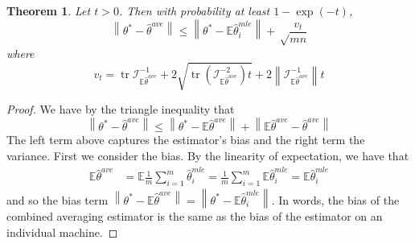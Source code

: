 \documentclass[twoside]{article}
\newtheorem{theorem}{Theorem}
\DeclareMathOperator*{\tr}{tr}
\newcommand{\E}{\mathbb{E}}
\newcommand{\w}{\theta}
\newcommand{\wave}{\hat\w^{ave}}
\newcommand{\wtave}{\E\hat\w^{ave}}
\newcommand{\wmle}{\hat\w^{mle}}
\newcommand{\wstar}{{\w^{*}}}
\newcommand{\I}{\mathcal I}
\newcommand{\ltwo}[1]{{\left\lVert {#1} \right\rVert}}
\begin{document}
\begin{theorem}
Let $t>0$.
Then with probability at least $1-\exp(-t)$,
\begin{equation}
\ltwo{\wstar-\wave} \le \ltwo{\wstar-\E\wmle_i} + \sqrt\frac{v_t}{mn}
\end{equation}
where
\begin{equation}
v_t =
\tr{\I^{-1}_{\wtave}}
+ 2\sqrt{\tr \left({\I^{-2}_{\wtave}}\right)t}
+ 2\ltwo{\I^{-1}_{\wtave}}t
\end{equation}
\end{theorem}
\begin{proof}
We have by the triangle inequality that
\begin{equation}
\ltwo{\wstar-\wave} \le \ltwo{\wstar-\E\wave} + \ltwo{\E\wave-\wave}
\label{eq:biasvar}
\end{equation}
The left term above captures the estimator's bias and the right term the variance.
First we consider the bias.
By the linearity of expectation, we have that
\begin{align}
\E\wave
&=
\E\frac{1}{m}\sum_{i=1}^m\wmle_i
=
\frac{1}{m}\sum_{i=1}^m\E\wmle_i
=
\E\wmle_i
\label{eq:expwave}
\end{align}
and so the bias term
$\ltwo{\wstar-\E\wave}
=
\ltwo{\wstar-\E\wmle_i}
$.
In words, the bias of the combined averaging estimator is the same as the bias of the estimator on an individual machine.


\end{proof}
\end{document}

